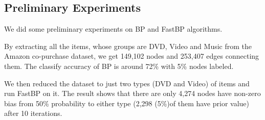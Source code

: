  \subsection{Preliminary Experiments}
We did some preliminary experiments on BP and FastBP algorithms.

By extracting all the items, whose groups are DVD, Video and Music from the Amazon co-purchase dataset, we get 149,102 nodes and 253,407 edges connecting them.
The classify accuracy of BP is around 72\% with 5\% nodes labeled.

We then reduced the dataset to just two types (DVD and Video) of items and run FastBP on it.
The result shows that there are only 4,274 nodes have non-zero bias from 50\% probability to either type (2,298 (5\%)of them have prior value) after 10 iterations.
